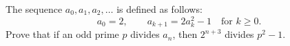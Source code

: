 The sequence $a_0, a_1, a_2, \ldots$ is defined as follows:
\[ a_0 = 2, \qquad a_{k+1} = 2a_k^2 - 1 \quad \text{for } k \geq 0. \]
Prove that if an odd prime $p$ divides $a_n$, then $2^{n+3}$ divides $p^2 - 1$.
